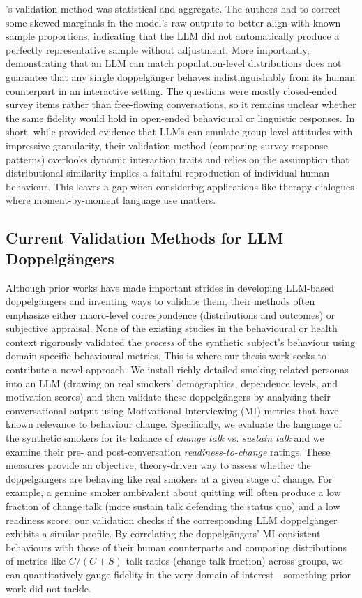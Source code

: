 \citet{argyle2023}'s validation method was statistical and aggregate. The authors had to correct some skewed marginals in the model's raw outputs to better align with known sample proportions, indicating that the LLM did not automatically produce a perfectly representative sample without adjustment. More importantly, demonstrating that an LLM can match population-level distributions does not guarantee that any single doppelgänger behaves indistinguishably from its human counterpart in an interactive setting. The questions were mostly closed-ended survey items rather than free-flowing conversations, so it remains unclear whether the same fidelity would hold in open-ended behavioural or linguistic responses. In short, while \citet{argyle2023} provided evidence that LLMs can emulate group-level attitudes with impressive granularity, their validation method (comparing survey response patterns) overlooks dynamic interaction traits and relies on the assumption that distributional similarity implies a faithful reproduction of individual human behaviour. This leaves a gap when considering applications like therapy dialogues where moment-by-moment language use matters.



\subsection{Current Validation Methods for LLM Doppelgängers}


Although prior works have made important strides in developing LLM-based doppelgängers and inventing ways to validate them, their methods often emphasize either macro-level correspondence (distributions and outcomes) or subjective appraisal. None of the existing studies in the behavioural or health context rigorously validated the \emph{process} of the synthetic subject's behaviour using domain-specific behavioural metrics. This is where our thesis work seeks to contribute a novel approach. We install richly detailed smoking-related personas into an LLM (drawing on real smokers' demographics, dependence levels, and motivation scores) and then validate these doppelgängers by analysing their conversational output using Motivational Interviewing (MI) metrics that have known relevance to behaviour change. Specifically, we evaluate the language of the synthetic smokers for its balance of \emph{change talk} vs. \emph{sustain talk} and we examine their pre- and post-conversation \emph{readiness-to-change} ratings. These measures provide an objective, theory-driven way to assess whether the doppelgängers are behaving like real smokers at a given stage of change. For example, a genuine smoker ambivalent about quitting will often produce a low fraction of change talk (more sustain talk defending the status quo) and a low readiness score; our validation checks if the corresponding LLM doppelgänger exhibits a similar profile. By correlating the doppelgängers' MI-consistent behaviours with those of their human counterparts and comparing distributions of metrics like $C/(C+S)$ talk ratios (change talk fraction) across groups, we can quantitatively gauge fidelity in the very domain of interest---something prior work did not tackle. 

